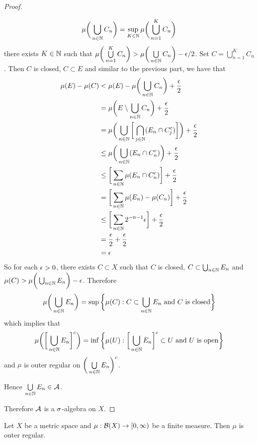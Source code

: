 \documentclass{book}
\begin{document}
\begin{proof}
\begin{enumerate}
\begin{itemize}
				$$\mu\bigg( \bigcup\limits_{n \in \mathbb{N}}C_n \bigg) = \sup\limits_{K \in \mathbb{N}} \mu\bigg(\bigcup\limits_{n=1}^K C_n \bigg)$$ 
				there exists $K \in \mathbb{N}$ such that $\mu\bigg(\bigcup\limits_{n=1}^K C_n \bigg) > \mu\bigg( \bigcup\limits_{n \in \mathbb{N}}C_n \bigg) - \epsilon/2 $. Set $C = \bigcup\limits_{n=1}^K C_n$.
				Then $C$ is closed, $C \subset E$ and similar to the previous part, we have that
				\begin{align*}
					\mu(E) - \mu(C)
					& < \mu(E) - \mu\bigg( \bigcup\limits_{n \in \mathbb{N}}C_n \bigg) + \frac{\epsilon}{2} \\
					&= \mu \bigg(E \setminus \bigcup\limits_{n \in \mathbb{N}}C_n   \bigg) +  \frac{\epsilon}{2} \\
					&= \mu \bigg( \bigcup\limits_{n \in \mathbb{N}} \bigg[ \bigcap_{j \in \mathbb{N}} (E_n \cap C_j^c)    \bigg] \bigg)  + \frac{\epsilon}{2} \\
					&\leq  \mu \bigg( \bigcup\limits_{n \in \mathbb{N}}  (E_n \cap C_n^c)  \bigg)  + \frac{\epsilon}{2} \\
					&\leq \bigg[ \sum_{n \in \mathbb{N}} \mu(E_n \cap C_n^c) \bigg] + \frac{\epsilon}{2}\\
					&=\bigg[ \sum_{n \in \mathbb{N}} \mu(E_n) - \mu(C_n) \bigg] +\frac{\epsilon}{2}\\
					&\leq \bigg[ \sum_{n \in \mathbb{N}} 2^{-n-1}\epsilon \bigg] + \frac{\epsilon}{2}\\
					&= \frac{\epsilon}{2} + \frac{\epsilon}{2} \\
					&= \epsilon 
				\end{align*}
				So for each $\epsilon >0$, there exists $C \subset X$ such that $C$ is closed, $C \subset \bigcup_{n \in \mathbb{N}}E_n$ and $\mu(C) > \mu \bigg( \bigcup_{n \in \mathbb{N}} E_n \bigg) - \epsilon$. Therefore 
				$$\mu \bigg( \bigcup_{n \in \mathbb{N}} E_n \bigg) = \sup \bigg \{ \mu(C): C \subset \bigcup_{n \in \mathbb{N}} E_n  \text{ and $C$ is closed} \bigg \}$$
				which implies that 
				$$\mu \bigg( \bigg[ \bigcup_{n \in \mathbb{N}} E_n \bigg]^c \bigg) = \inf \bigg \{ \mu(U): \bigg[ \bigcup_{n \in \mathbb{N}} E_n \bigg]^c \subset U  \text{ and $U$ is open} \bigg \}$$
				and $\mu$ is outer regular on $\bigg( \bigcup\limits_{n \in \mathbb{N}} E_n \bigg)^c$.
			\end{itemize}
		Hence $\bigcup\limits_{n \in \mathbb{N}} E_n \in \mathcal{A}$.
		\end{enumerate}
	Therefore $\mathcal{A}$ is a $\sigma$-algebra on $X$.
	\end{proof}

	\begin{ex}
		Let $X$ be a metric space and $\mu: \mathcal{B}(X) \rightarrow [0,\infty)$ be a finite measure. Then $\mu$ is outer regular.
	\end{ex}
\end{document}
